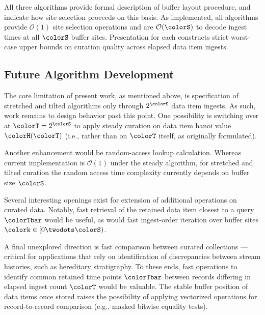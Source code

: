 All three algorithms provide formal description of buffer layout procedure, and indicate how site selection proceeds on this basis.
As implemented, all algorithms provide $\mathcal{O}(1)$ site selection operations and are $\mathcal{O}(\colorS)$ to decode ingest times at all $\colorS$ buffer sites.
Presentation for each constructs strict worst-case upper bounds on curation quality across elapsed data item ingests.

\subsection{Future Algorithm Development}

The core limitation of present work, as mentioned above, is specification of stretched and tilted algorithms only through $2^{\colorS}$ data item ingests.
As such, work remains to design behavior past this point.
One possibility is switching over at $\colorT = 2^{\colorS}$ to apply steady curation on data item hanoi value $\colorH(\colorT)$ (i.e., rather than on $\colorT$ itself, as originally formulated).

Another enhancement would be random-access lookup calculation.
Whereas current implementation is $\mathcal{O}(1)$ under the steady algorithm, for stretched and tilted curation the random access time complexity currently depends on buffer size $\colorS$.

Several interesting openings exist for extension of additional operations on curated data.
Notably, fast retrieval of the retained data item closest to a query $\colorTbar$ would be useful, as would fast ingest-order iteration over buffer sites $\colork \in [0 \twodots \colorS)$.

A final unexplored direction is fast comparison between curated collections --- critical for applications that rely on identification of discrepancies between stream histories, such as hereditary stratigraphy.
To these ends, fast operations to identify common retained time points $\colorTbar$ between records differing in elapsed ingest count $\colorT$ would be valuable.
The stable buffer position of data items once stored raises the possibility of applying vectorized operations for record-to-record comparison (e.g., masked bitwise equality tests).


